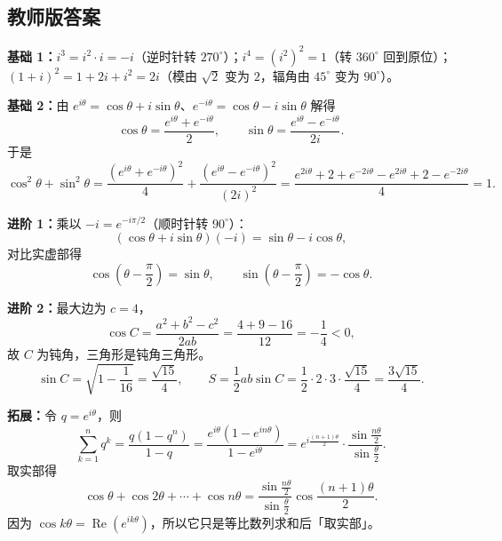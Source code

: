 \begin{afterclass}
\subsection*{教师版答案}
\begin{solution}
\textbf{基础 1：}$i^3=i^2\cdot i=-i$（逆时针转 $270^\circ$）；$i^4=(i^2)^2=1$（转 $360^\circ$ 回到原位）；
$(1+i)^2=1+2i+i^2=2i$（模由 $\sqrt2$ 变为 $2$，辐角由 $45^\circ$ 变为 $90^\circ$）。
\end{solution}
\begin{solution}
\textbf{基础 2：}由 $e^{i\theta}=\cos\theta+i\sin\theta$、$e^{-i\theta}=\cos\theta-i\sin\theta$ 解得
\[
  \cos\theta=\frac{e^{i\theta}+e^{-i\theta}}{2},\qquad
  \sin\theta=\frac{e^{i\theta}-e^{-i\theta}}{2i}.
\]
于是
\[
  \cos^2\theta+\sin^2\theta
  =\frac{(e^{i\theta}+e^{-i\theta})^2}{4}+\frac{(e^{i\theta}-e^{-i\theta})^2}{(2i)^2}
  =\frac{e^{2i\theta}+2+e^{-2i\theta}-e^{2i\theta}+2-e^{-2i\theta}}{4}=1.
\]
\end{solution}
\begin{solution}
\textbf{进阶 1：}乘以 $-i=e^{-i\pi/2}$（顺时针转 $90^\circ$）：
\[
  (\cos\theta+i\sin\theta)(-i)=\sin\theta-i\cos\theta,
\]
对比实虚部得
\[
  \cos\left(\theta-\frac{\pi}{2}\right)=\sin\theta,\qquad
  \sin\left(\theta-\frac{\pi}{2}\right)=-\cos\theta.
\]
\end{solution}
\begin{solution}
\textbf{进阶 2：}最大边为 $c=4$，
\[
  \cos C=\frac{a^2+b^2-c^2}{2ab}=\frac{4+9-16}{12}=-\frac14<0,
\]
故 $C$ 为钝角，三角形是钝角三角形。
\[
  \sin C=\sqrt{1-\frac1{16}}=\frac{\sqrt{15}}4,\qquad
  S=\frac12ab\sin C=\frac12\cdot2\cdot3\cdot\frac{\sqrt{15}}4=\frac{3\sqrt{15}}4.
\]
\end{solution}
\begin{solution}
\textbf{拓展：}令 $q=e^{i\theta}$，则
\[
  \sum_{k=1}^{n}q^k=\frac{q(1-q^n)}{1-q}
  =\frac{e^{i\theta}(1-e^{in\theta})}{1-e^{i\theta}}
  =e^{i\frac{(n+1)\theta}{2}}\cdot\frac{\sin\frac{n\theta}{2}}{\sin\frac{\theta}{2}}.
\]
取实部得
\[
  \cos\theta+\cos2\theta+\cdots+\cos n\theta
  =\frac{\sin\frac{n\theta}{2}}{\sin\frac{\theta}{2}}\cos\frac{(n+1)\theta}{2}.
\]
因为 $\cos k\theta=\operatorname{Re}(e^{ik\theta})$，所以它只是等比数列求和后「取实部」。
\end{solution}
\end{afterclass}
